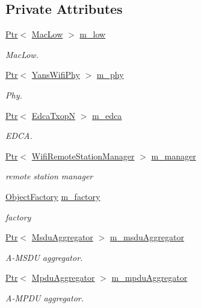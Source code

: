 \subsection*{Private Attributes}
\begin{DoxyCompactItemize}
\item 
\hyperlink{classns3_1_1Ptr}{Ptr}$<$ \hyperlink{classns3_1_1MacLow}{Mac\+Low} $>$ \hyperlink{classTwoLevelAggregationTest_a408234bde940ec7a7a61112d512f7a63}{m\+\_\+low}
\begin{DoxyCompactList}\small\item\em Mac\+Low. \end{DoxyCompactList}\item 
\hyperlink{classns3_1_1Ptr}{Ptr}$<$ \hyperlink{classns3_1_1YansWifiPhy}{Yans\+Wifi\+Phy} $>$ \hyperlink{classTwoLevelAggregationTest_a2e90603b55371a04829447a4341340b7}{m\+\_\+phy}
\begin{DoxyCompactList}\small\item\em Phy. \end{DoxyCompactList}\item 
\hyperlink{classns3_1_1Ptr}{Ptr}$<$ \hyperlink{classns3_1_1EdcaTxopN}{Edca\+TxopN} $>$ \hyperlink{classTwoLevelAggregationTest_a6ec1a641b23f7f6d1652462575d4feb1}{m\+\_\+edca}
\begin{DoxyCompactList}\small\item\em E\+D\+CA. \end{DoxyCompactList}\item 
\hyperlink{classns3_1_1Ptr}{Ptr}$<$ \hyperlink{classns3_1_1WifiRemoteStationManager}{Wifi\+Remote\+Station\+Manager} $>$ \hyperlink{classTwoLevelAggregationTest_a118997e06775ec177507bbf2dec94e2c}{m\+\_\+manager}
\begin{DoxyCompactList}\small\item\em remote station manager \end{DoxyCompactList}\item 
\hyperlink{classns3_1_1ObjectFactory}{Object\+Factory} \hyperlink{classTwoLevelAggregationTest_a5b0df48a92f6160fbdf46911f2dc6e26}{m\+\_\+factory}
\begin{DoxyCompactList}\small\item\em factory \end{DoxyCompactList}\item 
\hyperlink{classns3_1_1Ptr}{Ptr}$<$ \hyperlink{classns3_1_1MsduAggregator}{Msdu\+Aggregator} $>$ \hyperlink{classTwoLevelAggregationTest_aa220c44047f05dcda7f98f4a3856aade}{m\+\_\+msdu\+Aggregator}
\begin{DoxyCompactList}\small\item\em A-\/\+M\+S\+DU aggregator. \end{DoxyCompactList}\item 
\hyperlink{classns3_1_1Ptr}{Ptr}$<$ \hyperlink{classns3_1_1MpduAggregator}{Mpdu\+Aggregator} $>$ \hyperlink{classTwoLevelAggregationTest_af775305c6bfb80987c93ad200627318a}{m\+\_\+mpdu\+Aggregator}
\begin{DoxyCompactList}\small\item\em A-\/\+M\+P\+DU aggregator. \end{DoxyCompactList}\end{DoxyCompactItemize}
